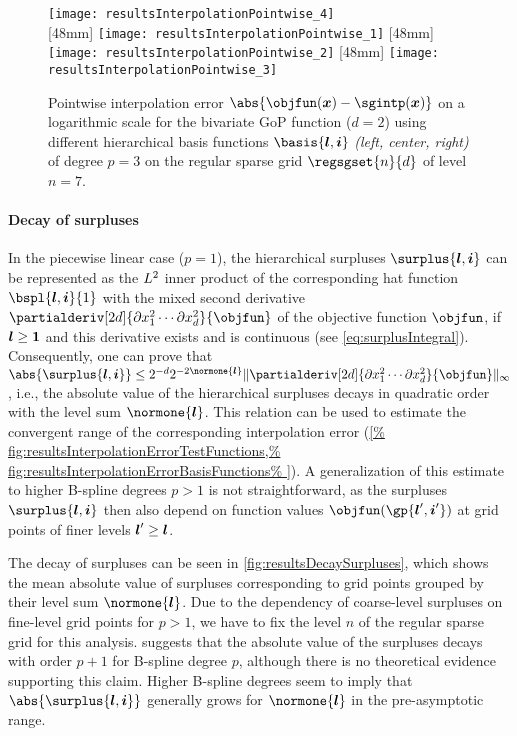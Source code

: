 \begin{figure}
  \texttt{[image: resultsInterpolationPointwise\_4]}\\[2mm]%
  [48mm]{%
    \texttt{[image: resultsInterpolationPointwise\_1]}%
  }%
  \hfill%
  [48mm]{%
    \texttt{[image: resultsInterpolationPointwise\_2]}%
  }%
  \hfill%
  [48mm]{%
    \texttt{[image: resultsInterpolationPointwise\_3]}%
  }%
  \caption[Pointwise interpolation error]{%
    Pointwise interpolation error
    $\abs{\objfun(\*x) - \sgintp(\*x)}$ on a logarithmic scale
    for the bivariate GoP function ($d = 2$)
    using different hierarchical basis functions
    $\basis{\*l,\*i}$ \emph{(left, center, right)} of degree $p = 3$ on
    the regular sparse grid $\regsgset{n}{d}$ of level $n = 7$.%
  }%
  \label{fig:resultsInterpolationErrorPointwise}%
\end{figure}

\paragraph{Decay of surpluses}

In the piecewise linear case ($p = 1$),
the hierarchical surpluses $\surplus{\*l,\*i}$
can be represented as the $L^2$ inner product of
the corresponding hat function $\bspl{\*l,\*i}{1}$ with the
mixed second derivative
$\partialderiv[2d]{\partialdiff x_1^2 \dotsm \partialdiff x_d^2}{\objfun}$
of the objective function $\objfun$,
if ${\boldsymbol{l}} \ge {\boldsymbol{1}}$ and this derivative exists and is continuous
(see \cref{eq:surplusIntegral}).
Consequently, one can prove that
$\abs{\surplus{\*l,\*i}} \le 2^{-d} 2^{-2\normone{\*l}}
\norm[\infty]{
  \partialderiv[2d]{\partialdiff x_1^2 \dotsm \partialdiff x_d^2}{\objfun}
}$ \cite{Bungartz04Sparse},
i.e., the absolute value of the hierarchical surpluses
decays in quadratic order with the level sum $\normone{\*l}$.
This relation can be used to estimate the convergent range
of the corresponding interpolation error (\cref{%
  fig:resultsInterpolationErrorTestFunctions,%
  fig:resultsInterpolationErrorBasisFunctions%
}).
A generalization of this estimate to higher B-spline degrees $p > 1$
is not straightforward, as the surpluses $\surplus{\*l,\*i}$
then also depend on function values $\objfun(\gp{\*l',\*i'})$ at
grid points of finer levels ${\boldsymbol{l}}' \ge {\boldsymbol{l}}$.

The decay of surpluses can be seen in \cref{fig:resultsDecaySurpluses},
which shows the mean absolute value of surpluses corresponding to
grid points grouped by their level sum $\normone{\*l}$.
Due to the dependency of coarse-level surpluses on fine-level grid points
for $p > 1$,
we have to fix the level $n$ of the regular sparse grid for this analysis.
 suggests that the
absolute value of the surpluses decays with order $p + 1$ for
B-spline degree $p$, although there is no theoretical evidence supporting
this claim.
Higher B-spline degrees seem to imply that
$\abs{\surplus{\*l,\*i}}$ generally grows for $\normone{\*l}$
in the pre-asymptotic range.

